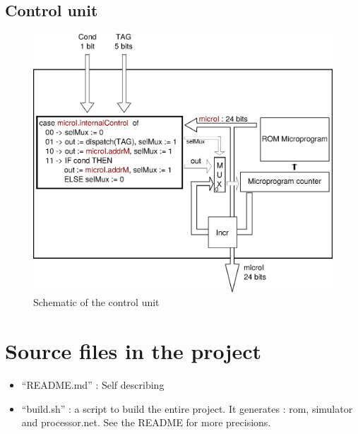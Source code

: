 \documentclass[a4paper, 11pt]{article}
\begin{document}
\subsection{Control unit}
\begin{figure}[h]
\center
\caption{Schematic of the control unit}
   \includegraphics[scale=0.5]{control.eps}
\end{figure}


\section{Source files in the project}
\begin{itemize}
\item \enquote{README.md} : Self describing
\item \enquote{build.sh} : a script to build the entire project. It generates : rom,
simulator and processor.net. See the README for more precisions.
\end{itemize}
\end{document}
